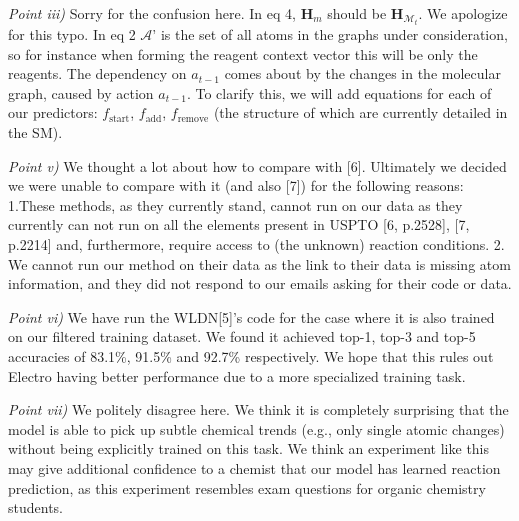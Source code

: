 \documentclass{article}
\begin{document}

\emph{Point iii)} 
Sorry for the confusion here. In eq 4, $\bm{H}_m$ should be $\bm{H}_{\mathcal{M}_t}$. We apologize for this typo.
In eq 2 $\mathcal{A}’$ is the set of all atoms in the graphs under consideration, so for instance when forming the reagent context vector this will be only the reagents.
The dependency on $a_{t-1}$ comes about by the changes in the molecular graph, caused by action $a_{t-1}$. 
To clarify this, we will add equations for each of our predictors: $f_\textrm{start}$, $f_\textrm{add}$, $f_\textrm{remove}$ (the structure of which are currently detailed in the SM).

\emph{Point v)} 
We thought a lot about how to compare with [6].
 Ultimately we decided we were unable to compare with it (and also [7]) for the following reasons:
  1.These methods, as they currently stand, cannot run on our data as they currently can not run on all the elements present in USPTO [6, p.2528], [7, p.2214] and, furthermore, require access to (the unknown) reaction conditions. 
 2. We cannot run our method on their data as the link to their data is missing atom information, and they did not respond to our emails asking for their code or data. 

\emph{Point vi)} We have run the WLDN[5]'s code for the case where it is also trained on our filtered training dataset.
 We found it achieved top-1, top-3 and top-5 accuracies of 83.1\%, 91.5\% and 92.7\% respectively. 
 We hope that this rules out Electro having better performance due to a more specialized training task.
  
\emph{Point vii)}
 We politely disagree here.
  We think it is completely surprising that the model is able to pick up subtle chemical trends (e.g., only single atomic changes) without being explicitly trained on this task.
   We think an experiment like this may give additional confidence to a chemist that our model has learned reaction prediction, as this experiment resembles exam questions for organic chemistry students. 
 
\end{document}
